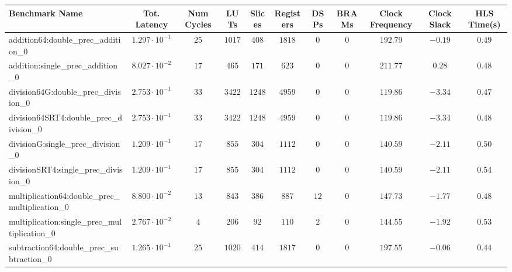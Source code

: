 \begin{tabular}{|l|c|c|c|c|c|c|c|c|c|c|}
\hline
Benchmark Name                                   & Tot. Latency            & Num Cycles & LUTs      & Slices   & Registers & DSPs   & BRAMs & Clock Frequency & Clock Slack & HLS Time(s) \\
\hline
addition64:double\_prec\_addition\_0             & $ 1.297 \cdot 10^{-1} $ & $ 25     $ & $ 1017  $ & $ 408  $ & $ 1818  $ & $ 0  $ & $ 0 $ & $ 192.79      $ & $ -0.19   $ & $ 0.49    $ \\
addition:single\_prec\_addition\_0               & $ 8.027 \cdot 10^{-2} $ & $ 17     $ & $ 465   $ & $ 171  $ & $ 623   $ & $ 0  $ & $ 0 $ & $ 211.77      $ & $ 0.28    $ & $ 0.48    $ \\
division64G:double\_prec\_division\_0            & $ 2.753 \cdot 10^{-1} $ & $ 33     $ & $ 3422  $ & $ 1248 $ & $ 4959  $ & $ 0  $ & $ 0 $ & $ 119.86      $ & $ -3.34   $ & $ 0.47    $ \\
division64SRT4:double\_prec\_division\_0         & $ 2.753 \cdot 10^{-1} $ & $ 33     $ & $ 3422  $ & $ 1248 $ & $ 4959  $ & $ 0  $ & $ 0 $ & $ 119.86      $ & $ -3.34   $ & $ 0.48    $ \\
divisionG:single\_prec\_division\_0              & $ 1.209 \cdot 10^{-1} $ & $ 17     $ & $ 855   $ & $ 304  $ & $ 1112  $ & $ 0  $ & $ 0 $ & $ 140.59      $ & $ -2.11   $ & $ 0.50    $ \\
divisionSRT4:single\_prec\_division\_0           & $ 1.209 \cdot 10^{-1} $ & $ 17     $ & $ 855   $ & $ 304  $ & $ 1112  $ & $ 0  $ & $ 0 $ & $ 140.59      $ & $ -2.11   $ & $ 0.54    $ \\
multiplication64:double\_prec\_multiplication\_0 & $ 8.800 \cdot 10^{-2} $ & $ 13     $ & $ 843   $ & $ 386  $ & $ 887   $ & $ 12 $ & $ 0 $ & $ 147.73      $ & $ -1.77   $ & $ 0.48    $ \\
multiplication:single\_prec\_multiplication\_0   & $ 2.767 \cdot 10^{-2} $ & $ 4      $ & $ 206   $ & $ 92   $ & $ 110   $ & $ 2  $ & $ 0 $ & $ 144.55      $ & $ -1.92   $ & $ 0.53    $ \\
subtraction64:double\_prec\_subtraction\_0       & $ 1.265 \cdot 10^{-1} $ & $ 25     $ & $ 1020  $ & $ 414  $ & $ 1817  $ & $ 0  $ & $ 0 $ & $ 197.55      $ & $ -0.06   $ & $ 0.44    $ \\

\end{tabular}
